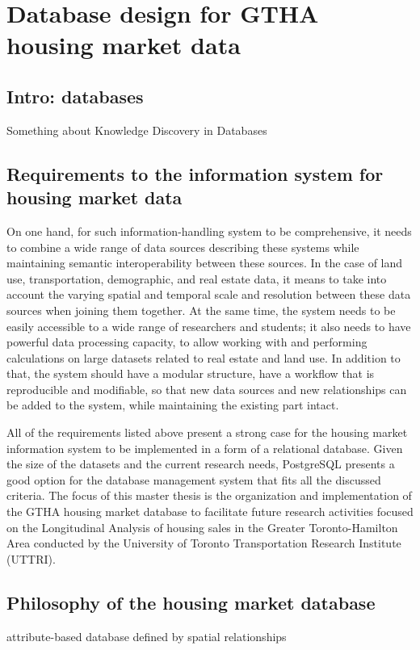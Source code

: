 \chapter{Database design for GTHA housing market data} \label{ch:database_design_for_gtha_housing_market_data}

\section{Intro: databases} \label{sec:intro_database_design}

Something about Knowledge Discovery in Databases

\section{Requirements to the information system for housing market data} \label{sec:requirements_to_information_system}

On one hand, for such information-handling system to be comprehensive, it needs to combine a wide range of data sources describing these systems while maintaining semantic interoperability between these sources.
In the case of land use, transportation, demographic, and real estate data, it means to take into account the varying spatial and temporal scale and resolution between these data sources when joining them together.
At the same time, the system needs to be easily accessible to a wide range of researchers and students;
it also needs to have powerful data processing capacity, to allow working with and performing calculations on large datasets related to real estate and land use.
In addition to that, the system should have a modular structure, have a workflow that is reproducible and modifiable, so that new data sources and new relationships can be added to the system, while maintaining the existing part intact.

All of the requirements listed above present a strong case for the housing market information system to be implemented in a form of a relational database.
Given the size of the datasets and the current research needs, PostgreSQL presents a good option for the database management system that fits all the discussed criteria.
The focus of this master thesis is the organization and implementation of the GTHA housing market database to facilitate future research activities focused on the Longitudinal Analysis of housing sales in the Greater Toronto-Hamilton Area conducted by the University of Toronto Transportation Research Institute (UTTRI).

\section{Philosophy of the housing market database} \label{sec:housing_market_database_philosophy}
attribute-based database defined by spatial relationships

